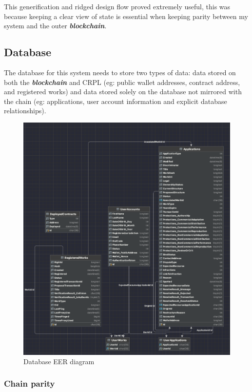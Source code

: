 \documentclass[12pt]{article}
\newcommand{\keyword}[1]{\textbf{\textit{#1}}}
\begin{document}
This generification and ridged design flow proved extremely useful, this was because keeping a clear view of state is essential when keeping parity between my system and the outer \keyword{blockchain}.

\subsection{Database}

The database for this system needs to store two types of data: data stored on both the \keyword{blockchain} and CRPL (eg: public wallet addresses, contract address, and registered works) and data stored solely on the database not mirrored with the chain (eg: applications, user account information and explicit database relationships).

\begin{figure}[H]
\caption{Database EER diagram}
\centering
\includegraphics[width=\textwidth,height=0.7\textheight,keepaspectratio]{images/patterns/database}
\end{figure}

\subsubsection{Chain parity}
\end{document}
